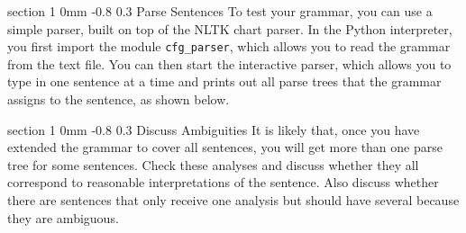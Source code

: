 \documentclass[10.9pt]{article}
\makeatletter
\newcommand{\newsec}[2]{\section{#1}\label{sec:#2}\noindent}
\renewcommand{\section}{\@startsection
{section}%
{1}%
{0mm}%
{-0.8\baselineskip}%
{0.3\baselineskip}%
{\bfseries\large}}%
\makeatother
\begin{document}
\newsec{Parse Sentences}{parse}%
To test your grammar, you can use a simple parser, built on top of the NLTK chart parser. In the Python interpreter, you first import the module {\tt cfg\_parser}, which allows you 
to read the grammar from the text file. You can then start the interactive parser, which allows you to type in one sentence at a time and prints out all parse trees that the grammar assigns to the sentence, as shown below.
\begin{center}
\fbox{

}
\end{center}

\newsec{Discuss Ambiguities}{parse}%
It is likely that, once you have extended the grammar to cover all sentences, you will get more than one parse tree for some sentences. Check these analyses and discuss whether they all correspond to reasonable interpretations of the sentence. Also discuss whether there are sentences that only receive one analysis but should have several because they are ambiguous.
\end{document}
